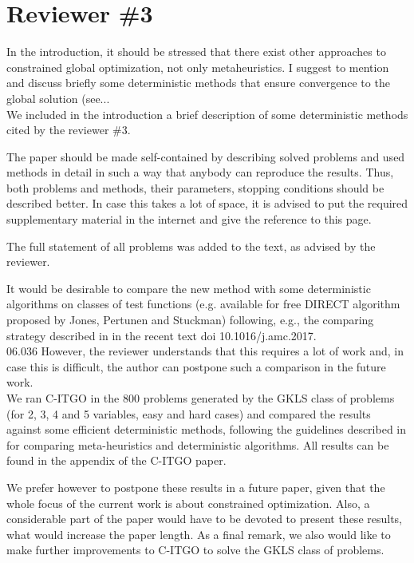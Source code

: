 
\section*{Reviewer \#3}

{\color{red} In the introduction, it should be stressed that there exist other approaches to constrained global optimization, not only metaheuristics. I suggest to mention and discuss briefly some deterministic methods that ensure convergence to the global solution (see... }\\

We included in the introduction a brief description of some deterministic methods cited by the reviewer \#3.


\vspace{1cm}


{\color{red} The paper should be made self-contained by describing solved problems and used methods in detail in such a way that anybody can reproduce the results. Thus, both problems and methods, their parameters, stopping conditions should be described better. In case this takes a lot of space, it is advised to put the required supplementary material in the internet and give the reference to this page. }


\vspace{1cm}


The full statement of all problems was added to the text, as advised by the reviewer.


\vspace{1cm}

{\color{red} It would be desirable to compare the new method with some deterministic algorithms on classes of test functions (e.g. available for free DIRECT algorithm proposed by Jones, Pertunen and Stuckman) following, e.g., the comparing strategy described in in the recent text doi 10.1016/j.amc.2017.\\06.036 However, the reviewer understands that this requires a lot of work and, in case this is difficult, the author can postpone such a comparison in the future work. } \\

We ran C-ITGO in the 800 problems generated by the GKLS class of problems (for 2, 3, 4 and 5 variables, easy and hard cases) and compared the results against some efficient deterministic methods, following the guidelines described in \cite{NAT} for comparing meta-heuristics and deterministic algorithms. All results can be found in the appendix of the C-ITGO paper.

We prefer however to postpone these results in a future paper, given that the whole focus of the current work is about constrained optimization. Also, a considerable part of the paper would have to be devoted to present these results, what would increase the paper length. As a final remark, we also would like to make further improvements to C-ITGO to solve the GKLS class of problems.